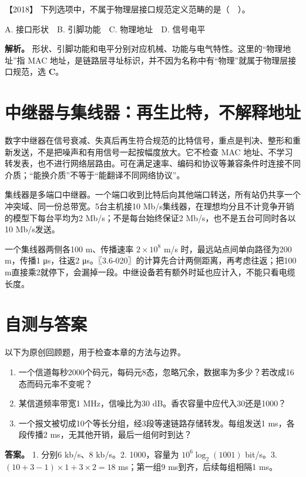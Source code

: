\noindent{}【2018】 下列选项中，不属于物理层接口规范定义范畴的是（　）。

A. 接口形状　B. 引脚功能　C. 物理地址　D. 信号电平


\textbf{解析。} 形状、引脚功能和电平分别对应机械、功能与电气特性。这里的``物理地址''指 MAC 地址，是链路层寻址标识，并不因为名称中有``物理''就属于物理层接口规范，选 \textbf{C}。

\section{中继器与集线器：再生比特，不解释地址}\label{cn-02-08}

数字中继器在信号衰减、失真后再生符合规范的比特信号，重点是判决、整形和重新发送，不是把噪声和有用信号一起按幅度放大。它不检查 MAC 地址、不学习转发表，也不进行网络层路由。可在满足速率、编码和协议等兼容条件时连接不同介质；``能换介质''不等于``能翻译不同网络协议''。

集线器是多端口中继器。一个端口收到比特后向其他端口转送，所有站仍共享一个冲突域、同一份总带宽。5台主机接10 Mb/s集线器，在理想均分且不计竞争开销的模型下每台平均为2 Mb/s；不是每台始终保证2 Mb/s，也不是五台可同时各以10 Mb/s发送。

一个集线器两侧各100 m、传播速率 \(2\times10^8\) m/s 时，最远站点间单向路径为200 m，传播1 μs，往返2 μs。〖3.6-020〗的计算先合计两侧距离，再考虑往返；把100 m直接乘2就停下，会漏掉一段。中继设备若有额外时延也应计入，不能只看电缆长度。

\section{自测与答案}\label{cn-ch2-review}

以下为原创回顾题，用于检查本章的方法与边界。

\begin{enumerate}
\def\labelenumi{\arabic{enumi}.}
\tightlist
\item
  一个信道每秒2000个码元，每码元8态，忽略冗余，数据率为多少？若改成16态而码元率不变呢？
\item
  某信道频率带宽1 MHz，信噪比为30 dB。香农容量中应代入30还是1000？
\item
  一个报文被切成10个等长分组，经3段等速链路存储转发。每组发送1 ms，各段传播2 ms，无其他开销，最后一组何时到达？
\end{enumerate}

\textbf{答案。} 1. 分别6 kb/s、8 kb/s。2. 1000，容量为 \(10^6\log_2(1001)\) bit/s。3. \((10+3-1)\times1+3\times2=18\) ms；第一组9 ms到齐，后续每组相隔1 ms。

